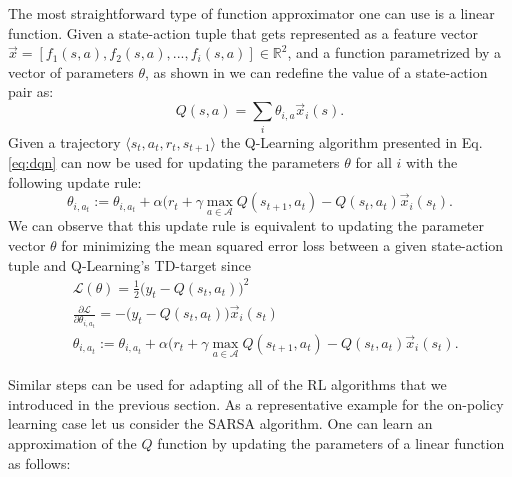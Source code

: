 The most straightforward type of function approximator one can use is a linear function. Given a state-action tuple that gets represented as a feature vector $\vec{x}=[f_1(s,a), f_2(s,a), ..., f_i(s,a)] \in \mathds{R}^2$, and a function parametrized by a vector of parameters $\theta$, as shown in \cite{wiering2004convergence} we can redefine the value of a state-action pair as:
\begin{equation}
	Q(s,a) = \sum_i \theta_{i,a} \vec{x}_i(s).
\end{equation}
Given a trajectory $\langle s_t,a_t,r_t,s_{t+1}\rangle$ the Q-Learning algorithm presented in Eq. \ref{eq:dqn} can now be used for updating the parameters $\theta$ for all $i$ with the following update rule:
\begin{equation}
	\theta_{i,a_t} := \theta_{i,a_t} + \alpha(r_t +\gamma\underset{a\in \mathcal{A}}{\max} Q(s_{t+1},a_t) - Q(s_t, a_t)\vec{x}_i(s_t).
	\label{eq:q_learning_fa}
\end{equation}
We can observe that this update rule is equivalent to updating the parameter vector $\theta$ for minimizing the mean squared error loss between a given state-action tuple and Q-Learning's TD-target since  
\begin{align}
	& \mathcal{L}(\theta) = \frac{1}{2}\big(y_t - Q(s_t, a_t)\big)^2 \\ 
	& \frac{\partial\mathcal{L}}{\partial \theta_{i,a_t}}=-\big(y_t - Q(s_t, a_t)\big)\vec{x}_i(s_t)  \\ 
 	& \theta_{i,a_t} := \theta_{i,a_t} + \alpha(r_t +\gamma\underset{a\in \mathcal{A}}{\max} Q(s_{t+1},a_t) - Q(s_t, a_t)\vec{x}_i(s_t).
\end{align}

Similar steps can be used for adapting all of the RL algorithms that we introduced in the previous section. As a representative example for the on-policy learning case let us consider the SARSA algorithm. One can learn an approximation of the $Q$ function by updating the parameters of a linear function as follows:

